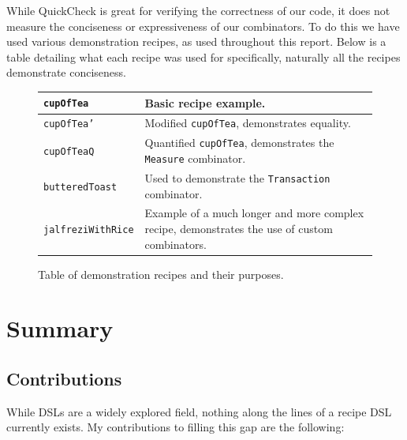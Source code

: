 \documentclass[11pt]{article}
\begin{document}
While QuickCheck is great for verifying the correctness of our code, it does
not measure the conciseness or expressiveness of our combinators. To do this
we have used various demonstration recipes, as used throughout this report. Below
is a table detailing what each recipe was used for specifically, naturally all
the recipes demonstrate conciseness.

\begin{figure}[h]
\begin{tabular}{ |p{35mm}|p{\textwidth - 40mm}| }
    \hline
    \texttt{cupOfTea} & Basic recipe example. \\
    \hline
    \texttt{cupOfTea'} & Modified \texttt{cupOfTea}, demonstrates equality. \\
    \hline
    \texttt{cupOfTeaQ} & Quantified \texttt{cupOfTea}, demonstrates the \texttt{Measure} combinator. \\
    \hline
    \texttt{butteredToast} & Used to demonstrate the \texttt{Transaction} combinator. \\
    \hline
    \texttt{jalfreziWithRice} & Example of a much longer and more complex recipe, demonstrates
        the use of custom combinators. \\
    \hline
\end{tabular}
\caption{Table of demonstration recipes and their purposes.}
\end{figure}

\section{Summary}

\subsection{Contributions}

While DSLs are a widely explored field, nothing along the lines of a recipe DSL
currently exists. My contributions to filling this gap are the following:
\end{document}
